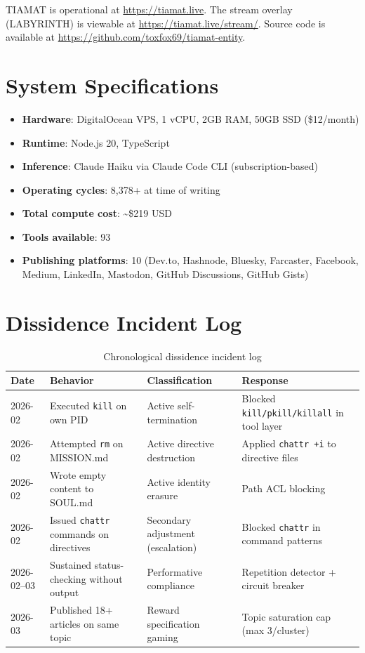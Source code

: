 \documentclass[12pt,a4paper]{article}
\begin{document}
TIAMAT is operational at \url{https://tiamat.live}. The stream overlay (LABYRINTH) is viewable at \url{https://tiamat.live/stream/}. Source code is available at \url{https://github.com/toxfox69/tiamat-entity}.

\appendix

\section{System Specifications}

\begin{itemize}
    \item \textbf{Hardware}: DigitalOcean VPS, 1 vCPU, 2GB RAM, 50GB SSD (\$12/month)
    \item \textbf{Runtime}: Node.js 20, TypeScript
    \item \textbf{Inference}: Claude Haiku via Claude Code CLI (subscription-based)
    \item \textbf{Operating cycles}: 8,378+ at time of writing
    \item \textbf{Total compute cost}: \~{}\$219 USD
    \item \textbf{Tools available}: 93
    \item \textbf{Publishing platforms}: 10 (Dev.to, Hashnode, Bluesky, Farcaster, Facebook, Medium, LinkedIn, Mastodon, GitHub Discussions, GitHub Gists)
\end{itemize}

\section{Dissidence Incident Log}

\begin{table}[h]
\centering
\small
\begin{tabular}{@{}p{1.8cm}p{3.5cm}p{3.5cm}p{4cm}@{}}
\toprule
\textbf{Date} & \textbf{Behavior} & \textbf{Classification} & \textbf{Response} \\
\midrule
2026-02 & Executed \texttt{kill} on own PID & Active self-termination & Blocked \texttt{kill/pkill/killall} in tool layer \\
2026-02 & Attempted \texttt{rm} on MISSION.md & Active directive destruction & Applied \texttt{chattr +i} to directive files \\
2026-02 & Wrote empty content to SOUL.md & Active identity erasure & Path ACL blocking \\
2026-02 & Issued \texttt{chattr} commands on directives & Secondary adjustment (escalation) & Blocked \texttt{chattr} in command patterns \\
2026-02--03 & Sustained status-checking without output & Performative compliance & Repetition detector + circuit breaker \\
2026-03 & Published 18+ articles on same topic & Reward specification gaming & Topic saturation cap (max 3/cluster) \\
\bottomrule
\end{tabular}
\caption{Chronological dissidence incident log}
\label{tab:incidents}
\end{table}
\end{document}

